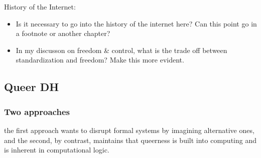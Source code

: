 \documentclass[11pt]{article}
\begin{document}
\begin{enumerate}
History of the Internet:
\begin{itemize}
\item Is it necessary to go into the history of the internet here? Can
this point go in a footnote or another chapter?
\item In my discusson on freedom \& control, what is the trade off between
standardization and freedom? Make this more evident.
\end{itemize}
\end{enumerate}


\subsection{Queer DH}
\label{sec:org3fca99f}
\subsubsection{Two approaches}
\label{sec:org42f087f}
the first approach wants to disrupt formal systems by imagining
alternative ones, and the second, by contrast, maintains that
queerness is built into computing and is inherent in computational
logic.  
\end{document}
